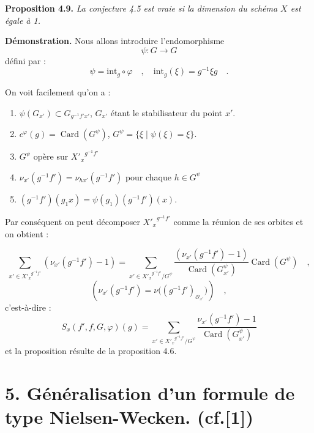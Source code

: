 \medskip
\noindent
\textbf{Proposition 4.9.} \emph{La conjecture 4.5 est vraie si la dimension du schéma $X$ est égale à 1.}

\medskip

\noindent
\textbf{Démonstration.} Nous allons introduire l'endomorphisme
\[
\psi : G \longrightarrow G
\]
défini par :
\[
\psi = \mathrm{int}_g \circ \varphi \quad , \quad \mathrm{int}_g(\xi) = g^{-1}\xi g \quad .
\]

On voit facilement qu'on a :
\begin{enumerate}
\item[i)] $\psi(G_{x'}) \subset G_{g^{-1}f'x'}$, $G_{x'}$ étant le stabilisateur du point $x'$.
\item[ii)] $c^\varphi(g) = \operatorname{Card}(G^\psi)$, $G^\psi = \{ \xi \mid \psi(\xi) = \xi \}$.
\item[iii)] $G^\psi$ opère sur ${X'_x}^{g^{-1}f'}$
\item[iv)] $\nu_{x'}(g^{-1}f') = \nu_{hx'}(g^{-1}f')$ pour chaque $h \in G^\psi$
\item[v)] $(g^{-1}f')(g_1x) = \psi(g_1)(g^{-1}f')(x)$.
\end{enumerate}

Par conséquent on peut décomposer ${X'_x}^{g^{-1}f'}$ comme la réunion de ses orbites et on obtient :

\begin{equation}\tag{4.9.1}
\sum_{x' \in {X'_x}^{g^{-1}f'}} (\nu_{x'}(g^{-1}f') - 1) = \sum_{x' \in {X'_x}^{g^{-1}f'}/G^\psi} \frac{(\nu_{x'}(g^{-1}f') - 1)}{\operatorname{Card}(G^\psi_{x'})} \operatorname{Card}(G^\psi) \quad ,
\end{equation}
\[
(\nu_{x'}(g^{-1}f')=\nu\bigl((g^{-1}f')_{\mathcal{O}_{x'}}\bigr)) \quad ,
\]
c'est-à-dire :
\begin{equation}\tag{4.9.2}
S_x(f',f,G,\varphi)(g)=\sum_{x' \in {X'_x}^{g^{-1}f'}/G^\psi}
\frac{\nu_{x'}(g^{-1}f')-1}{\operatorname{Card}(G^\psi_{x'})}
\end{equation}
et la proposition résulte de la proposition 4.6.


\section*{5. Généralisation d'un formule de type Nielsen-Wecken. {\normalfont (cf.[1])}}


